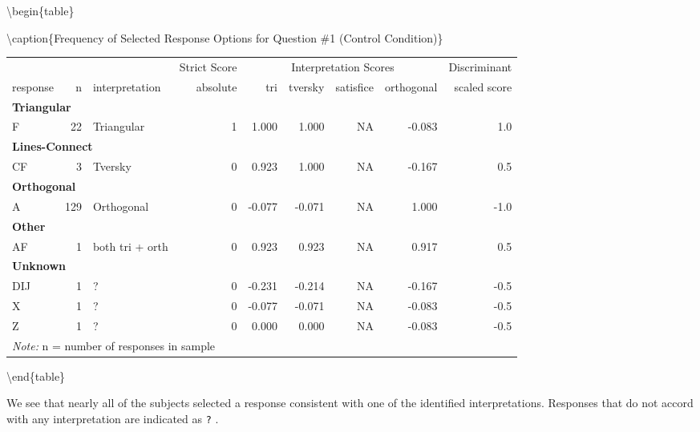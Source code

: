 \documentclass[
  letterpaper,
  DIV=11,
  numbers=noendperiod]{scrreprt}
\begin{document}
\textbackslash begin\{table\}

\textbackslash caption\{\label{tab:Q1-CONTROL-RESPONSES}Frequency of
Selected Response Options for Question \#1 (Control Condition)\}
\centering

\begin{tabular}[t]{l|r|l|r|r|r|r|r|r}
\hline
\multicolumn{3}{c|}{ } & \multicolumn{1}{c|}{Strict Score} & \multicolumn{4}{c|}{Interpretation Scores} & \multicolumn{1}{c}{Discriminant} \\
\cline{4-4} \cline{5-8} \cline{9-9}
response & n & interpretation & absolute & tri & tversky & satisfice & orthogonal & scaled score\\
\hline
\multicolumn{9}{l}{\textbf{Triangular}}\\
\hline
\hspace{1em}F & 22 & Triangular & 1 & 1.000 & 1.000 & NA & -0.083 & 1.0\\
\hline
\multicolumn{9}{l}{\textbf{Lines-Connect}}\\
\hline
\hspace{1em}CF & 3 & Tversky & 0 & 0.923 & 1.000 & NA & -0.167 & 0.5\\
\hline
\multicolumn{9}{l}{\textbf{Orthogonal}}\\
\hline
\hspace{1em}A & 129 & Orthogonal & 0 & -0.077 & -0.071 & NA & 1.000 & -1.0\\
\hline
\multicolumn{9}{l}{\textbf{Other}}\\
\hline
\hspace{1em}AF & 1 & both tri + orth & 0 & 0.923 & 0.923 & NA & 0.917 & 0.5\\
\hline
\multicolumn{9}{l}{\textbf{Unknown}}\\
\hline
\hspace{1em}DIJ & 1 & ? & 0 & -0.231 & -0.214 & NA & -0.167 & -0.5\\
\hline
\hspace{1em}X & 1 & ? & 0 & -0.077 & -0.071 & NA & -0.083 & -0.5\\
\hline
\hspace{1em}Z & 1 & ? & 0 & 0.000 & 0.000 & NA & -0.083 & -0.5\\
\hline
\multicolumn{9}{l}{\rule{0pt}{1em}\textit{Note: } n = number of responses in sample}\\
\end{tabular}

\textbackslash end\{table\}

We see that nearly all of the subjects selected a response consistent
with one of the identified interpretations. Responses that do not accord
with any interpretation are indicated as \texttt{?} .
\end{document}
